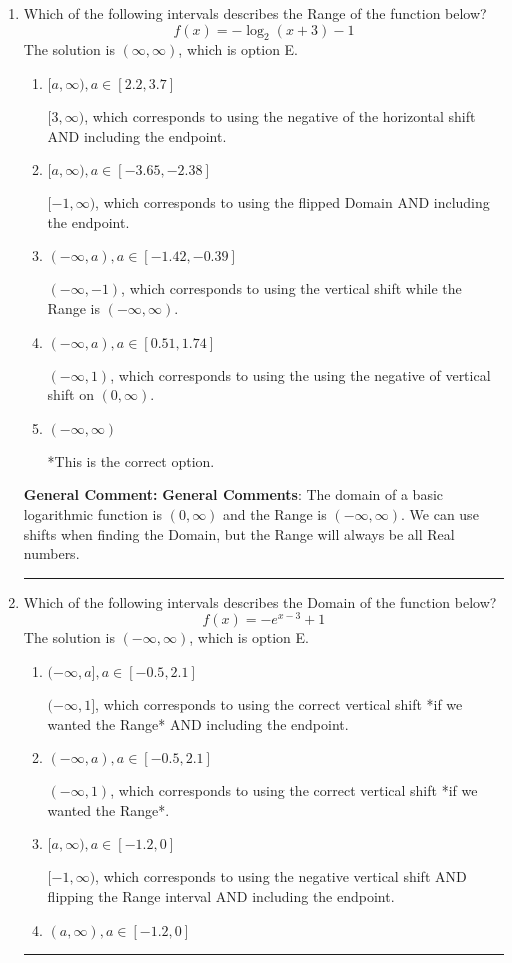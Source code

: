 \documentclass{extbook}[14pt]
\newcommand{\litem}[1]{\item #1

\rule{\textwidth}{0.4pt}}
\begin{document}
\begin{enumerate}\litem{
Which of the following intervals describes the Range of the function below?
\[ f(x) = -\log_2{(x+3)}-1 \]
The solution is \( (\infty, \infty) \), which is option E.\begin{enumerate}[label=\Alph*.]
\item \( [a, \infty), a \in [2.2, 3.7] \)

$[3, \infty)$, which corresponds to using the negative of the horizontal shift AND including the endpoint.
\item \( [a, \infty), a \in [-3.65, -2.38] \)

$[-1, \infty)$, which corresponds to using the flipped Domain AND including the endpoint.
\item \( (-\infty, a), a \in [-1.42, -0.39] \)

$(-\infty, -1)$, which corresponds to using the vertical shift while the Range is $(-\infty, \infty)$.
\item \( (-\infty, a), a \in [0.51, 1.74] \)

$(-\infty, 1)$, which corresponds to using the using the negative of vertical shift on $(0, \infty)$.
\item \( (-\infty, \infty) \)

*This is the correct option.
\end{enumerate}

\textbf{General Comment:} \textbf{General Comments}: The domain of a basic logarithmic function is $(0, \infty)$ and the Range is $(-\infty, \infty)$. We can use shifts when finding the Domain, but the Range will always be all Real numbers.
}
\litem{
Which of the following intervals describes the Domain of the function below?
\[ f(x) = -e^{x-3}+1 \]
The solution is \( (-\infty, \infty) \), which is option E.\begin{enumerate}[label=\Alph*.]
\item \( (-\infty, a], a \in [-0.5, 2.1] \)

$(-\infty, 1]$, which corresponds to using the correct vertical shift *if we wanted the Range* AND including the endpoint.
\item \( (-\infty, a), a \in [-0.5, 2.1] \)

$(-\infty, 1)$, which corresponds to using the correct vertical shift *if we wanted the Range*.
\item \( [a, \infty), a \in [-1.2, 0] \)

$[-1, \infty)$, which corresponds to using the negative vertical shift AND flipping the Range interval AND including the endpoint.
\item \( (a, \infty), a \in [-1.2, 0] \)


\end{enumerate}}
\end{enumerate}
\end{document}
